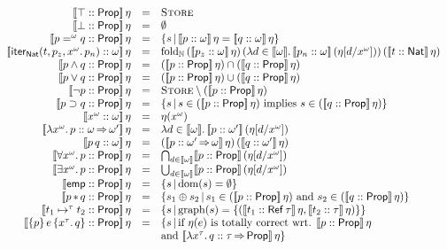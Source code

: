 \documentclass[12pt,a4paper]{article}
\begin{document}
\[\begin{array}{rcl}
  \semantic{\tj{\top}{\Prop}}\,\eta &=& \Store \\
  \semantic{\tj{\bot}{\Prop}}\,\eta &=& \emptyset \\
  \semantic{\tj{p =^\omega q}{\Prop}}\,\eta &=& \{s\,|\,\semantic{\tj{p}{\omega}}\,\eta = \semantic{\tj{q}{\omega}}\,\eta\} \\
  \semantic{\tj{\iternat{t}{p_z}{x^\omega}{p_n}}{\omega}}\,\eta &=& \fold_\N\,(\semantic{\tj{p_z}{\omega}}\,\eta)\,(\abstr{d\in\semantic{\omega}}{\semantic{\tj{p_n}{\omega}}\,(\eta[d/x^\omega])})\,(\semantic{\tj{t}{\Nat}}\,\eta) \\
  \semantic{\tj{p \wedge q}{\Prop}}\,\eta &=& (\semantic{\tj{p}{\Prop}}\,\eta) \cap (\semantic{\tj{q}{\Prop}}\,\eta) \\
  \semantic{\tj{p \vee q}{\Prop}}\,\eta &=& (\semantic{\tj{p}{\Prop}}\,\eta) \cup (\semantic{\tj{q}{\Prop}}\,\eta) \\
  \semantic{\tj{\neg p}{\Prop}}\,\eta &=& \Store \setminus (\semantic{\tj{p}{\Prop}}\,\eta) \\
  \semantic{\tj{p \supset q}{\Prop}}\,\eta &=& \{s\,|\,s\in(\semantic{\tj{p}{\Prop}}\,\eta) \text{ implies } s\in(\semantic{\tj{q}{\Prop}}\,\eta)\} \\
  \semantic{\tj{x^\omega}{\omega}}\,\eta &=& \eta(x^\omega) \\
  \semantic{\tj{\abstr{x^\omega}{p}}{\omega \tto \omega'}}\,\eta &=& \abstr{d\in \semantic{\omega}}{\semantic{\tj{p}{\omega'}}\,(\eta[d/x^\omega])} \\
  \semantic{\tj{\app{p}{q}}{\omega}}\,\eta &=& \app{(\semantic{\tj{p}{\omega' \tto \omega}}\,\eta)}{(\semantic{\tj{q}{\omega'}}\,\eta)} \\
  \semantic{\tj{\qall{x^\omega}{p}}{\Prop}}\,\eta &=& \bigcap_{d \in \semantic{\omega}} \semantic{\tj{p}{\Prop}}\,(\eta[d/x^\omega]) \\
  \semantic{\tj{\qex{x^\omega}{p}}{\Prop}}\,\eta &=& \bigcup_{d \in \semantic{\omega}} \semantic{\tj{p}{\Prop}}\,(\eta[d/x^\omega]) \\
  \semantic{\tj{\emp}{\Prop}}\,\eta &=& \{s\,|\,\dom{s} = \emptyset\} \\
  \semantic{\tj{p \sepcon q}{\Prop}}\,\eta &=& \{s_1 \oplus s_2\,|\,s_1 \in (\semantic{\tj{p}{\Prop}}\,\eta) \text{ and } s_2 \in (\semantic{\tj{q}{\Prop}}\,\eta)\} \\
  \semantic{\tj{t_1 \mapsto^\tau t_2}{\Prop}}\,\eta &=& \{s\,|\,\grph{s} = \{(\semantic{\tj{t_1}{\Ref{\tau}}}\,\eta,\semantic{\tj{t_2}{\tau}}\,\eta)\}\} \\
  \semantic{\tj{\triplex{p}{e}{x^\tau}{q}}{\Prop}}\,\eta &=& \{s\,|\,\text{if $\eta(e)$ is totally correct wrt. $\semantic{\tj{p}{\Prop}}\,\eta$} \\
    && \text{and $\semantic{\tj{\abstr{x^\tau}{q}}{\tau \tto \Prop}}\,\eta$}\}
\end{array}\]
\end{document}
